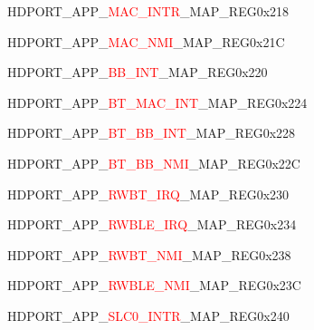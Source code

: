 \begin{register}{H}{DPORT\_APP\_\textcolor{red}{MAC\_INTR}\_MAP\_REG}{0x218}\label{regdesc:APPMACINTRMAPREG}
\end{register}
\vspace{-3em}
\begin{register}{H}{DPORT\_APP\_\textcolor{red}{MAC\_NMI}\_MAP\_REG}{0x21C}\label{regdesc:APPMACNMIMAPREG}
\end{register}
\vspace{-3em}
\begin{register}{H}{DPORT\_APP\_\textcolor{red}{BB\_INT}\_MAP\_REG}{0x220}\label{regdesc:APPBBINTMAPREG}
\end{register}
\vspace{-3em}
\begin{register}{H}{DPORT\_APP\_\textcolor{red}{BT\_MAC\_INT}\_MAP\_REG}{0x224}\label{regdesc:APPBTMACINTMAPREG}
\end{register}
\vspace{-3em}
\begin{register}{H}{DPORT\_APP\_\textcolor{red}{BT\_BB\_INT}\_MAP\_REG}{0x228}\label{regdesc:APPBTBBINTMAPREG}
\end{register}
\vspace{-3em}
\begin{register}{H}{DPORT\_APP\_\textcolor{red}{BT\_BB\_NMI}\_MAP\_REG}{0x22C}\label{regdesc:APPBTBBNMIMAPREG}
\end{register}
\vspace{-3em}
\begin{register}{H}{DPORT\_APP\_\textcolor{red}{RWBT\_IRQ}\_MAP\_REG}{0x230}\label{regdesc:APPRWBTIRQMAPREG}
\end{register}
\vspace{-3em}
\begin{register}{H}{DPORT\_APP\_\textcolor{red}{RWBLE\_IRQ}\_MAP\_REG}{0x234}\label{regdesc:APPRWBLEIRQMAPREG}
\end{register}
\vspace{-3em}
\begin{register}{H}{DPORT\_APP\_\textcolor{red}{RWBT\_NMI}\_MAP\_REG}{0x238}\label{regdesc:APPRWBTNMIMAPREG}
\end{register}
\vspace{-3em}
\begin{register}{H}{DPORT\_APP\_\textcolor{red}{RWBLE\_NMI}\_MAP\_REG}{0x23C}\label{regdesc:APPRWBLENMIMAPREG}
\end{register}
\vspace{-3em}
\begin{register}{H}{DPORT\_APP\_\textcolor{red}{SLC0\_INTR}\_MAP\_REG}{0x240}\label{regdesc:APPSLC0INTRMAPREG}
\end{register}
